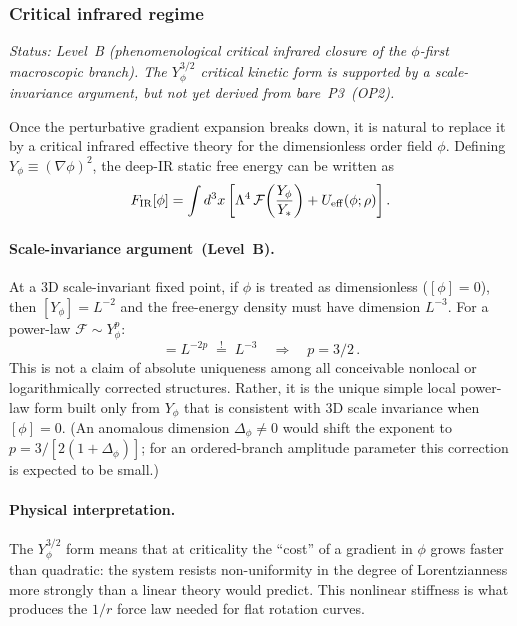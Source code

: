 \documentclass[11pt,a4paper]{article}
\numberwithin{equation}{section}
\begin{document}
\subsubsection*{Critical infrared regime}
\label{subsec:lof_critical}

\textit{Status: Level~B (phenomenological critical infrared
closure of the $\phi$-first macroscopic branch). The
$Y_\phi^{3/2}$ critical kinetic form is supported by a
scale-invariance argument, but not yet derived from bare~P3~(OP2).}

Once the perturbative gradient expansion breaks down, it is
natural to replace it by a critical infrared effective theory for
the dimensionless order field $\phi$. Defining
$Y_\phi \equiv (\nabla\phi)^2$, the deep-IR static free energy
can be written as
\begin{equation}
F_{\rm IR}[\phi]
= \int d^3x\left[
  \Lambda^4\,\mathcal{F}\!\left(\frac{Y_\phi}{Y_*}\right)
  + U_{\rm eff}(\phi;\rho)
\right].
\label{eq:fir_main}
\end{equation}

\paragraph{Scale-invariance argument~(Level~B).}
At a 3D scale-invariant fixed point, if $\phi$ is treated as
dimensionless ($[\phi] = 0$), then $[Y_\phi] = L^{-2}$ and
the free-energy density must have dimension $L^{-3}$.  For a
power-law $\mathcal{F} \sim Y_\phi^p$:
\begin{equation}
[Y_\phi^p] = L^{-2p} \;\stackrel{!}{=}\; L^{-3}
\quad\Longrightarrow\quad
\boxed{p = 3/2\,.}
\end{equation}
This is not a claim of absolute uniqueness among all conceivable
nonlocal or logarithmically corrected structures. Rather, it is
the unique simple local power-law form built only from $Y_\phi$
that is consistent with 3D scale invariance when $[\phi] = 0$.
(An anomalous dimension $\Delta_\phi \neq 0$ would shift the
exponent to $p = 3/[2(1+\Delta_\phi)]$; for an ordered-branch amplitude
parameter this correction is expected to be small.)

\paragraph{Physical interpretation.}
The $Y_\phi^{3/2}$ form means that at criticality the ``cost''
of a gradient in $\phi$ grows faster than quadratic: the system
resists non-uniformity in the degree of Lorentzianness more
strongly than a linear theory would predict.  This nonlinear
stiffness is what produces the $1/r$ force law needed for flat
rotation curves.
\end{document}
